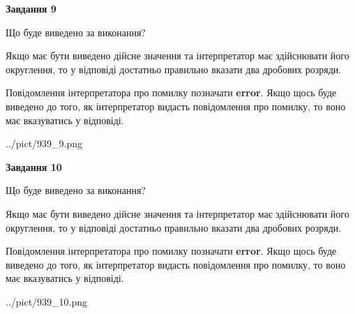 \documentclass[12pt, ukrainian]{article}
\begin{document}
{\begin {Large}
{\begin {center}\textbf{Завдання 9}\end {center}}\par
Що буде виведено за виконання? \par

Якщо має бути виведено дійсне значення та інтерпретатор має здійснювати його округлення, 
то у відповіді достатньо правильно вказати два дробових розряди.

Повідомлення інтерпретатора про помилку позначати \textbf{error}.
Якщо щось буде виведено до того, як інтерпретатор видасть повідомлення про помилку, 
то воно має вказуватись у відповіді. \par

\begin{center}
	{../pict/939_9.png}
\end{center}
\newpage

{\begin {center}\textbf{Завдання 10}\end {center}}\par
Що буде виведено за виконання? \par

Якщо має бути виведено дійсне значення та інтерпретатор має здійснювати його округлення, 
то у відповіді достатньо правильно вказати два дробових розряди.

Повідомлення інтерпретатора про помилку позначати \textbf{error}.
Якщо щось буде виведено до того, як інтерпретатор видасть повідомлення про помилку, 
то воно має вказуватись у відповіді. \par

\begin{center}
	{../pict/939_10.png}
\end{center}
\newpage

\end {Large}}
\end{document}

